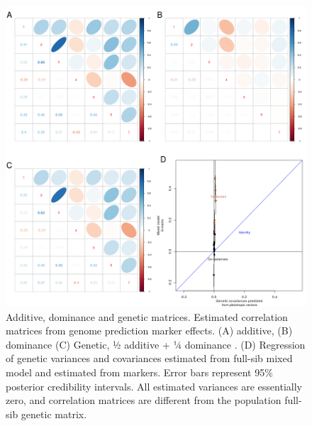 \begin{refsection}
\begin{figure}
	\includegraphics[width=\linewidth]{chapter_JoH-Melo_etal/media/growth_cov_prediction_composite_GP.png}
	\caption[Additive, dominance and genetic matrices]{Additive, dominance and genetic matrices. 
	Estimated correlation matrices from genome prediction marker effects. (A)
additive, (B) dominance (C) Genetic, ½ additive + ¼ dominance . (D)
Regression of genetic variances and covariances estimated from full-sib
mixed model and estimated from markers. Error bars represent 95\%
posterior credibility intervals. All estimated variances are essentially
zero, and correlation matrices are different from the population
full-sib genetic matrix.}
\end{figure}

\end{refsection}

